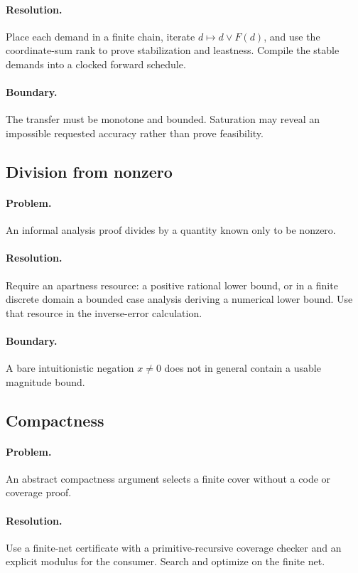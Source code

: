 \paragraph{Resolution.}
Place each demand in a finite chain, iterate \(d\mapsto d\vee F(d)\), and use
the coordinate-sum rank to prove stabilization and leastness.  Compile the
stable demands into a clocked forward schedule.

\paragraph{Boundary.}
The transfer must be monotone and bounded.  Saturation may reveal an impossible
requested accuracy rather than prove feasibility.

\subsection{Division from nonzero}

\paragraph{Problem.}
An informal analysis proof divides by a quantity known only to be nonzero.

\paragraph{Resolution.}
Require an apartness resource: a positive rational lower bound, or in a finite
discrete domain a bounded case analysis deriving a numerical lower bound.  Use
that resource in the inverse-error calculation.

\paragraph{Boundary.}
A bare intuitionistic negation \(x\ne0\) does not in general contain a usable
magnitude bound.

\subsection{Compactness}

\paragraph{Problem.}
An abstract compactness argument selects a finite cover without a code or
coverage proof.

\paragraph{Resolution.}
Use a finite-net certificate with a primitive-recursive coverage checker and an
explicit modulus for the consumer.  Search and optimize on the finite net.


